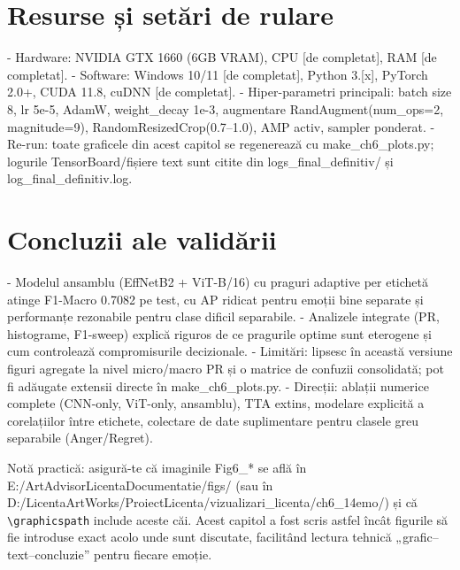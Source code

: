 \section{Resurse și setări de rulare}
- Hardware: NVIDIA GTX 1660 (6GB VRAM), CPU [de completat], RAM [de completat].
- Software: Windows 10/11 [de completat], Python 3.[x], PyTorch 2.0+, CUDA 11.8, cuDNN [de completat].
- Hiper-parametri principali: batch size 8, lr 5e-5, AdamW, weight\_decay 1e-3, augmentare RandAugment(num\_ops=2, magnitude=9), RandomResizedCrop(0.7–1.0), AMP activ, sampler ponderat.
- Re-run: toate graficele din acest capitol se regenerează cu make\_ch6\_plots.py; logurile TensorBoard/fișiere text sunt citite din logs\_final\_definitiv/ și log\_final\_definitiv.log.

\section{Concluzii ale validării}
- Modelul ansamblu (EffNetB2 + ViT-B/16) cu praguri adaptive per etichetă atinge F1-Macro 0.7082 pe test, cu AP ridicat pentru emoții bine separate și performanțe rezonabile pentru clase dificil separabile.
- Analizele integrate (PR, histograme, F1-sweep) explică riguros de ce pragurile optime sunt eterogene și cum controlează compromisurile decizionale.
- Limitări: lipsesc în această versiune figuri agregate la nivel micro/macro PR și o matrice de confuzii consolidată; pot fi adăugate extensii directe în make\_ch6\_plots.py.
- Direcții: ablații numerice complete (CNN-only, ViT-only, ansamblu), TTA extins, modelare explicită a corelațiilor între etichete, colectare de date suplimentare pentru clasele greu separabile (Anger/Regret).

\bigskip
\noindent Notă practică: asigură-te că imaginile Fig6\_* se află în E:/ArtAdvisorLicentaDocumentatie/figs/ (sau în D:/LicentaArtWorks/ProiectLicenta/vizualizari\_licenta/ch6\_14emo/) și că \verb|\graphicspath| include aceste căi. Acest capitol a fost scris astfel încât figurile să fie introduse exact acolo unde sunt discutate, facilitând lectura tehnică „grafic–text–concluzie” pentru fiecare emoție.


